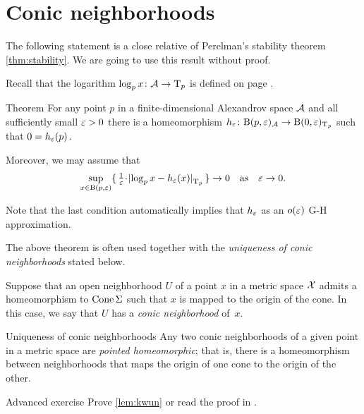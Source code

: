 \section{Conic neighborhoods}

The following statement \cite{perelman1993} is a close relative of Perelman's stability theorem \ref{thm:stability}.
We are going to use this result without proof.

Recall that the logarithm $\log_px\colon\mathcal{A}\to \mathrm{T}_p$ is defined on page \pageref{page:log}.

\begin{thm}{Theorem}\label{thm:spherical-nbhd}
For any point $p$ in a finite-dimensional Alexandrov space $\mathcal{A}$
and all sufficiently small $\varepsilon>0$
there is a homeomorphism $h_\varepsilon\colon\mathrm{B}{}(p,\varepsilon)_{\mathcal{A}}\to \mathrm{B}{}(0,\varepsilon)_{\mathrm{T}_p}$ such that $0=h_\varepsilon(p)$.

Moreover, we may assume that
\[
\sup_{x\in \oBall(p,\eps)}\{\,\tfrac1\eps\cdot\dist{\log_px}{h_\eps(x)}{\T_p}\,\}\to 0
\quad\text{as}\quad
\eps\to 0.\]
\end{thm}
Note that the last condition automatically implies that  $h_\varepsilon$ as an $o(\varepsilon)$ G-H approximation.

The above theorem is often used together with the \textit{uniqueness of conic neighborhoods} stated below.

Suppose that an open  neighborhood $U$ of a point $x$ in a metric space $\mathcal{X}$
admits a homeomorphism to $\mathop{\rm Cone}\nolimits\Sigma$ such that $x$ is mapped to the origin of the cone.
In this case, we say that $U$ has a \emph{conic neighborhood} of~$x$.

\begin{thm}{Uniqueness of conic neighborhoods}\label{lem:kwun}
Any two conic neighborhoods of a given point in a metric space are \emph{pointed homeomorphic}; that is, there is a homeomorphism between neighborhoods that maps the origin of one cone to the origin of the other.
\end{thm}

\begin{thm}{Advanced exercise}\label{ex:conic}
Prove \ref{lem:kwun} or read the proof in \cite{kwun1964}.
\end{thm}


